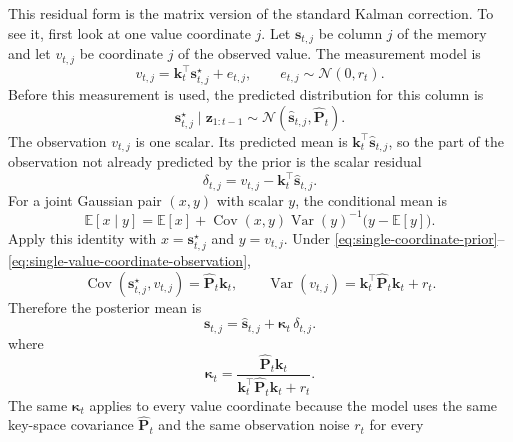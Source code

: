 \documentclass[11pt]{article}
\newcommand{\ve}[1]{\boldsymbol{#1}}
\newcommand{\tr}{\intercal}
\begin{document}
This residual form is the matrix version of the standard Kalman correction. To see it,
first look at one value coordinate $j$. Let $\ve{s}_{t,j}$ be column $j$ of the memory and
let $v_{t,j}$ be coordinate $j$ of the observed value. The measurement model is
\begin{equation}
  v_{t,j}
  =
  \ve{k}_t^{\tr}\ve{s}_{t,j}^\star+e_{t,j},
  \qquad
  e_{t,j}\sim\mathcal{N}(0,r_t).
  \label{eq:single-value-coordinate-observation}
\end{equation}
Before this measurement is used, the predicted distribution for this column is
\begin{equation}
  \ve{s}_{t,j}^\star \mid \ve{z}_{1:t-1}
  \sim
  \mathcal{N}(\widehat{\ve{s}}_{t,j},\widehat{\ve{P}}_t).
  \label{eq:single-coordinate-prior}
\end{equation}
The observation $v_{t,j}$ is one scalar. Its predicted mean is
$\ve{k}_t^{\tr}\widehat{\ve{s}}_{t,j}$, so the part of the observation not already predicted
by the prior is the scalar residual
\begin{equation}
  \delta_{t,j}
  =
  v_{t,j}-\ve{k}_t^{\tr}\widehat{\ve{s}}_{t,j}.
  \label{eq:single-coordinate-innovation}
\end{equation}
For a joint Gaussian pair $(x,y)$ with scalar $y$, the conditional mean is
\[
  \mathbb{E}[x\mid y]
  =
  \mathbb{E}[x]
  +
  \operatorname{Cov}(x,y)\operatorname{Var}(y)^{-1}
  \big(y-\mathbb{E}[y]\big).
\]
Apply this identity with $x=\ve{s}_{t,j}^\star$ and $y=v_{t,j}$. Under
\eqref{eq:single-coordinate-prior}--\eqref{eq:single-value-coordinate-observation},
\begin{equation}
  \operatorname{Cov}(\ve{s}_{t,j}^\star,v_{t,j})
  =
  \widehat{\ve{P}}_t\ve{k}_t,
  \qquad
  \operatorname{Var}(v_{t,j})
  =
  \ve{k}_t^{\tr}\widehat{\ve{P}}_t\ve{k}_t+r_t.
  \label{eq:single-coordinate-cross-cov}
\end{equation}
Therefore the posterior mean is
\begin{equation}
  \ve{s}_{t,j}
  =
  \widehat{\ve{s}}_{t,j}
  +
  \ve{\kappa}_t\,\delta_{t,j}.
  \label{eq:single-coordinate-kalman-correction}
\end{equation}
where
\begin{equation}
  \ve{\kappa}_t
  =
  \frac{\widehat{\ve{P}}_t\ve{k}_t}
  {\ve{k}_t^{\tr}\widehat{\ve{P}}_t\ve{k}_t+r_t}.
  \label{eq:single-coordinate-gain}
\end{equation}
The same $\ve{\kappa}_t$ applies to every value coordinate because the model uses the same
key-space covariance $\widehat{\ve{P}}_t$ and the same observation noise $r_t$ for every
\end{document}
